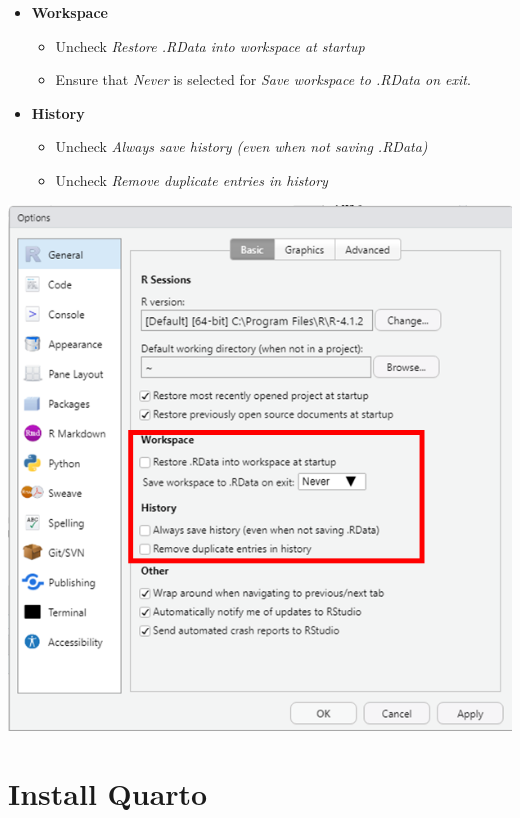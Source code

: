 \documentclass[
  letterpaper,
  DIV=11,
  numbers=noendperiod]{scrreprt}
\providecommand{\tightlist}{%
  \setlength{\itemsep}{0pt}\setlength{\parskip}{0pt}}\usepackage{longtable,booktabs,array}
\begin{document}
\begin{itemize}
\tightlist
\item
  \textbf{Workspace}

  \begin{itemize}
  \item
    Uncheck \emph{Restore .RData into workspace at startup}
  \item
    Ensure that \emph{Never} is selected for \emph{Save workspace to
    .RData on exit}.
  \end{itemize}
\item
  \textbf{History}

  \begin{itemize}
  \item
    Uncheck \emph{Always save history (even when not saving .RData)}
  \item
    Uncheck \emph{Remove duplicate entries in history}
  \end{itemize}
\end{itemize}

\includegraphics{./images/paste-A507B21D.png}

\hypertarget{sec-Quarto-installation}{%
\section{Install Quarto}\label{sec-Quarto-installation}}
\end{document}
